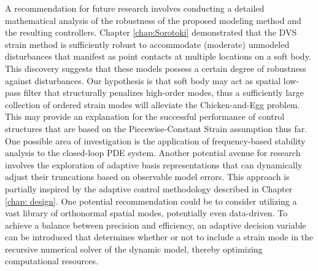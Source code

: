 A recommendation for future research involves conducting a detailed mathematical analysis of the robustness of the proposed modeling method and the resulting controllers. Chapter \ref{chap:Sorotoki} demonstrated that the DVS strain method is sufficiently robust to accommodate (moderate) unmodeled disturbances that manifest as point contacts at multiple locations on a soft body. This discovery suggests that these models possess a certain degree of robustness against disturbances. Our hypothesis is that soft body may act as spatial low-pass filter that structurally penalizes high-order modes, thus a sufficiently large collection of ordered strain modes will alleviate the {Chicken-and-Egg} problem. This may provide an explanation for the successful performance of control structures that are based on the Piecewise-Constant Strain assumption thus far. One possible area of investigation is the application of frequency-based stability analysis to the closed-loop PDE system. Another potential avenue for research involves the exploration of adaptive basis representations that can dynamically adjust their truncations based on observable model errors. This approach is partially inspired by the adaptive control methodology described in Chapter \ref{chap: design}. One potential recommendation could be to consider utilizing a vast library of orthonormal spatial modes, potentially even data-driven. To achieve a balance between precision and efficiency, an adaptive decision variable can be introduced that determines whether or not to include a strain mode in the recursive numerical solver of the dynamic model, thereby optimizing computational resources.

